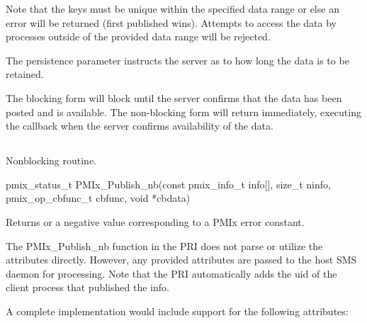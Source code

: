 Note that the keys must be unique within the specified data range or else an error will be returned (first published wins).
Attempts to access the data by processes outside of the provided data range will be rejected.

The persistence parameter instructs the server as to how long the data is to be retained.

The blocking form will block until the server confirms that the data has been posted and is available.
The non-blocking form will return immediately, executing the callback when the server confirms availability of the data.


\subsection{}

\summary

Nonblocking  routine.

\format

\cspecificstart
\begin{codepar}
pmix_status_t
PMIx_Publish_nb(const pmix_info_t info[], size_t ninfo,
                pmix_op_cbfunc_t cbfunc, void *cbdata)
\end{codepar}
\cspecificend

\begin{arglist}
\end{arglist}

Returns  or a negative value corresponding to a PMIx error constant.

\priattr
The PMIx_Publish_nb function in the \ac{PRI} does not parse or utilize the attributes directly. However, any provided attributes are passed to the host \ac{SMS} daemon for processing. Note that the \ac{PRI} automatically adds the uid of the client process that published the info.

\optattr
A complete implementation would include support for the following attributes:


